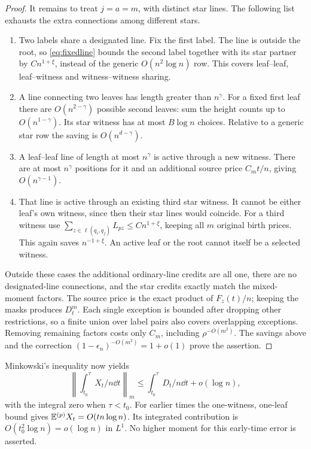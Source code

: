 \begin{proof}
It remains to treat \(j=a=m\), with distinct star lines. The
following list exhausts the extra connections among different stars.
\begin{enumerate}[label=(\roman*)]
\item Two labels share a designated line. Fix the first label.
The line is outside the root, so \eqref{eq:fixedline} bounds the
second label together with its star partner by \(C n^{1+\xi}\),
instead of the generic \(O(n^2\log n)\) row. This covers leaf--leaf,
leaf--witness and witness--witness sharing.
\item A line connecting two leaves has length greater than
\(n^\gamma\). For a fixed first leaf there are
\(O(n^{2-\gamma})\) possible second leaves: sum the height counts
up to \(O(n^{1-\gamma})\). Its star witness has at most
\(B\log n\) choices. Relative to a generic star row the saving
is \(O(n^{d-\gamma})\).
\item A leaf--leaf line of length at most \(n^\gamma\) is active
through a new witness. There are at most \(n^\gamma\) positions
for it and an additional source price \(C_mt/n\), giving
\(O(n^{\gamma-1})\).
\item That line is active through an existing third star witness.
It cannot be either leaf's own witness, since then their star lines
would coincide. For a third witness use
\(\sum_{z\in\ell(q_i,q_j)}L_{pz}\le C n^{1+\xi}\), keeping all
\(m\) original birth prices. This again saves \(n^{-1+\xi}\).
An active leaf or the root cannot itself be a selected witness.
\end{enumerate}
Outside these cases the additional ordinary-line credits are all
one, there are no designated-line connections, and the star credits
exactly match the mixed-moment factors. The source price is the
exact product of \(F_z(t)/n\); keeping the masks produces \(D_t^m\).
Each single exception is bounded after dropping other restrictions,
so a finite union over label pairs also covers overlapping exceptions.
Removing remaining factors costs only \(C_m\), including
\(\rho^{-O(m^2)}\). The savings above and the correction
\((1-\epsilon_n)^{-O(m^2)}=1+o(1)\) prove the assertion.
\end{proof}

Minkowski's inequality now yields
\begin{equation}\label{eq:shortintegral}
 \left\|\int_{t_0}^\tau X_t/n\dd t\right\|_m
 \le\int_{t_0}^\tau D_t/n\dd t+o(\log n),
\end{equation}
with the integral zero when \(\tau<t_0\).
For earlier times the one-witness, one-leaf bound gives
\(\mathbb E^{(p)}X_t=O(tn\log n)\). Its integrated contribution is
\(O(t_0^2\log n)=o(\log n)\) in \(L^1\). No higher moment for
this early-time error is asserted.


